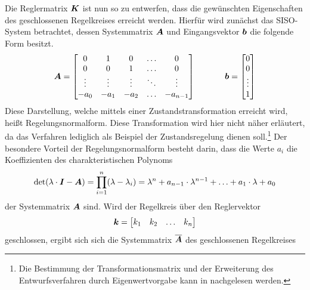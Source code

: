 Die Reglermatrix $\boldsymbol{K}$ ist nun so zu entwerfen, dass die gewünschten Eigenschaften des geschlossenen Regelkreises erreicht werden. Hierfür wird zunächst das SISO-System  betrachtet, dessen Systemmatrix $\boldsymbol{A}$ und Eingangsvektor $\boldsymbol{b}$ die folgende Form besitzt.
\begin{equation}
\boldsymbol{A} = \begin{bmatrix}
0 & 1 & 0 & \hdots & 0 \\
0 & 0 & 1 & \hdots & 0 \\
\vdots & \vdots & \vdots & \ddots & \vdots \\
-a_{\text{0}} & -a_{\text{1}} & -a_{\text{2}} & \hdots & -a_{n-1}
\end{bmatrix}
\hspace{35pt}
\boldsymbol{b} = \begin{bmatrix}
0 \\ 0 \\ \vdots \\ 1
\end{bmatrix}
\end{equation}
Diese Darstellung, welche mittels einer Zustandstransformation erreicht wird, heißt Regelungsnormalform. Diese Transformation wird hier nicht näher erläutert, da das Verfahren lediglich als Beispiel der Zustandsregelung dienen soll.\footnote{Die Bestimmung der Transformationsmatrix und der Erweiterung des Entwurfsverfahren durch Eigenwertvorgabe kann in \cite[S. 245]{LunzeRT2} nachgelesen werden.} Der besondere Vorteil der Regelungsnormalform besteht darin, dass die Werte $a_i$ die Koeffizienten des charakteristischen Polynoms 
\begin{equation}
\text{det}(\lambda\cdot \boldsymbol{I}-\boldsymbol{A}) = \prod^n_{i=1} (\lambda-\lambda_i) = \lambda^n+a_{n-1}\cdot \lambda^{n-1} + \hdots + a_{\text{1}}\cdot \lambda + a_{\text{0}}
\end{equation}
der Systemmatrix $\boldsymbol{A}$ sind. Wird der Regelkreis über den Reglervektor
\begin{equation}
\boldsymbol{k} = \begin{bmatrix}
k_1 & k_2 & \hdots & k_n
\end{bmatrix}
\end{equation}
geschlossen, ergibt sich sich die  Systemmatrix $\boldsymbol{\overline{A}}$ des geschlossenen Regelkreises
